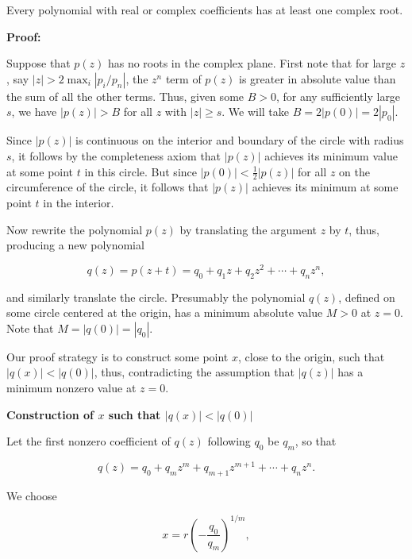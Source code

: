 Every polynomial with real or complex coefficients has at least one complex root.
\vspace{\baselineskip}

\textbf{Proof:}

Suppose that \(p(z)\) has no roots in the complex plane. First note that for large \(z\), say 
\(|z| > 2 \max_i |p_i/p_n|\), the \(z^n\) term of \(p(z)\) is greater in absolute 
value than the sum of all the other terms. Thus, given some \(B > 0\), for any sufficiently large \(s\), 
we have \(|p(z)| > B\) for all \(z\) with \(|z| \geq s\). We will take \(B = 2|p(0)| = 2|p_0|\).
\vspace{\baselineskip}

Since \(|p(z)|\) is continuous on the interior and boundary of the circle with radius \(s\), it follows 
by the completeness axiom that \(|p(z)|\) achieves its minimum value at some point \(t\) in this circle. 
But since \(|p(0)| < \frac{1}{2} |p(z)|\) for all \(z\) on the circumference of the circle, it follows 
that \(|p(z)|\) achieves its minimum at some point \(t\) in the interior.
\vspace{\baselineskip}

Now rewrite the polynomial \(p(z)\) by translating the argument \(z\) by \(t\), thus, producing a 
new polynomial

\[
	q(z) = p(z + t) = q_0 + q_1 z + q_2 z^2 + \cdots + q_n z^n,
\]

and similarly translate the circle. Presumably the polynomial \(q(z)\), defined on some circle centered 
at the origin, has a minimum absolute value \(M > 0\) at \(z = 0\). Note that \(M = |q(0)| = |q_0|\).
\vspace{\baselineskip}

Our proof strategy is to construct some point \(x\), close to the origin, such that \(|q(x)| < |q(0)|\), 
thus, contradicting the assumption that \(|q(z)|\) has a minimum nonzero value at \(z = 0\).
\vspace{\baselineskip}

\textbf{Construction of \(x\) such that \(|q(x)| < |q(0)|\)}
\vspace{\baselineskip}

Let the first nonzero coefficient of \(q(z)\) following \(q_0\) be \(q_m\), so that

\[
	q(z) = q_0 + q_m z^m + q_{m+1} z^{m+1} + \cdots + q_n z^n.
\]

We choose

\[
	x = r {\left(-\frac{q_0}{q_m}\right)}^{1/m},
\]


